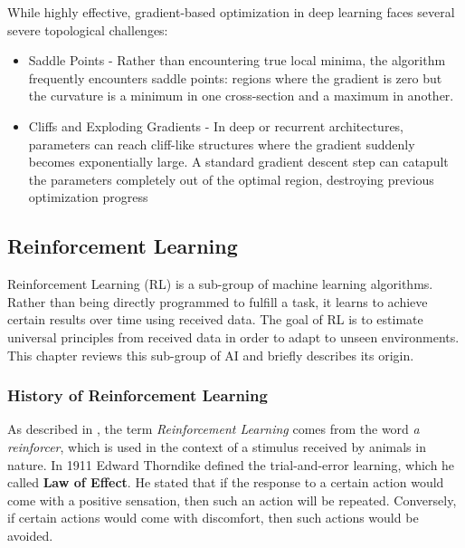 
While highly effective, gradient-based optimization in deep learning faces several severe topological challenges:
\begin{itemize}
	\item Saddle Points - Rather than encountering true local minima, the algorithm frequently encounters saddle points: regions where the gradient is zero but the curvature is a minimum in one cross-section and a maximum in another.
	\item Cliffs and Exploding Gradients - In deep or recurrent architectures, parameters can reach cliff-like structures where the gradient suddenly becomes exponentially large. A standard gradient descent step can catapult the parameters completely out of the optimal region, destroying previous optimization progress
\end{itemize}


\subsection{Reinforcement Learning}
\label{chap:Reinforcement_Learning_subchap}
Reinforcement Learning (RL) is a sub-group of machine learning algorithms. Rather than being directly programmed to fulfill a task, it learns to achieve certain results over time using received data. The goal of RL is to estimate universal principles from received data in order to adapt to unseen environments. This chapter reviews this sub-group of AI and briefly describes its origin.
\subsubsection{History of Reinforcement Learning}
As described in \cite{Reinforcement_learning_book}, the term \textit{Reinforcement Learning} comes from the word \textit{a reinforcer}, which is used in the context of a stimulus received by animals in nature. In 1911 Edward Thorndike defined the trial-and-error learning, which he called \textbf{Law of Effect}. He stated that if the response to a certain action would come with a positive sensation, then such an action will be repeated. Conversely, if certain actions would come with discomfort, then such actions would be avoided.

